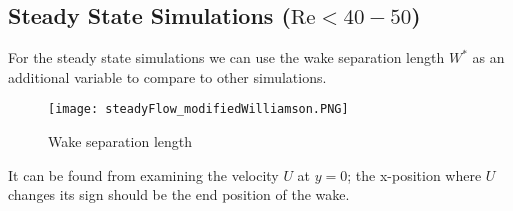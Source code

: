 	
	
	\subsection{Steady State Simulations ($\text{Re} < 40-50$)}
	For the steady state simulations we can use the wake separation length $W^*$ as an additional variable to compare to other simulations.
			\begin{figure}[htp]
				\centering
				\texttt{[image: steadyFlow\_modifiedWilliamson.PNG]}
				\caption{Wake separation length }
				\label{fig:wakeSeparation}
			\end{figure} 
	It can be found from examining the velocity $U$ at $y=0$; the x-position where $U$ changes its sign should be the end position of the wake.
%
%	
